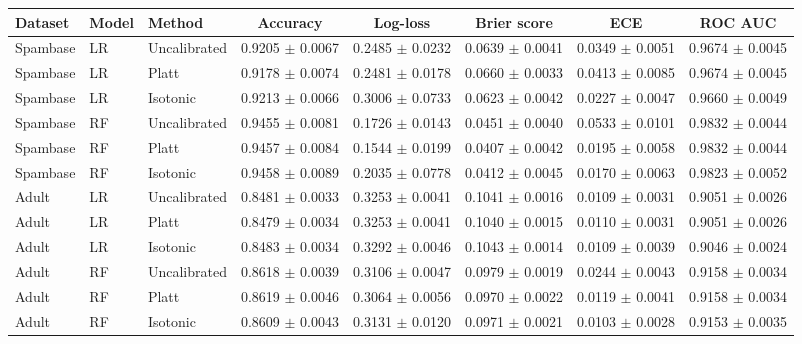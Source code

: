 \begin{tabular}{lllccccc}
\toprule
Dataset & Model & Method & Accuracy & Log-loss & Brier score & ECE & ROC AUC \\
\midrule
Spambase & LR & Uncalibrated & 0.9205 $\pm$ 0.0067 & 0.2485 $\pm$ 0.0232 & 0.0639 $\pm$ 0.0041 & 0.0349 $\pm$ 0.0051 & 0.9674 $\pm$ 0.0045 \\
Spambase & LR & Platt & 0.9178 $\pm$ 0.0074 & 0.2481 $\pm$ 0.0178 & 0.0660 $\pm$ 0.0033 & 0.0413 $\pm$ 0.0085 & 0.9674 $\pm$ 0.0045 \\
Spambase & LR & Isotonic & 0.9213 $\pm$ 0.0066 & 0.3006 $\pm$ 0.0733 & 0.0623 $\pm$ 0.0042 & 0.0227 $\pm$ 0.0047 & 0.9660 $\pm$ 0.0049 \\
\addlinespace
Spambase & RF & Uncalibrated & 0.9455 $\pm$ 0.0081 & 0.1726 $\pm$ 0.0143 & 0.0451 $\pm$ 0.0040 & 0.0533 $\pm$ 0.0101 & 0.9832 $\pm$ 0.0044 \\
Spambase & RF & Platt & 0.9457 $\pm$ 0.0084 & 0.1544 $\pm$ 0.0199 & 0.0407 $\pm$ 0.0042 & 0.0195 $\pm$ 0.0058 & 0.9832 $\pm$ 0.0044 \\
Spambase & RF & Isotonic & 0.9458 $\pm$ 0.0089 & 0.2035 $\pm$ 0.0778 & 0.0412 $\pm$ 0.0045 & 0.0170 $\pm$ 0.0063 & 0.9823 $\pm$ 0.0052 \\
\midrule
Adult & LR & Uncalibrated & 0.8481 $\pm$ 0.0033 & 0.3253 $\pm$ 0.0041 & 0.1041 $\pm$ 0.0016 & 0.0109 $\pm$ 0.0031 & 0.9051 $\pm$ 0.0026 \\
Adult & LR & Platt & 0.8479 $\pm$ 0.0034 & 0.3253 $\pm$ 0.0041 & 0.1040 $\pm$ 0.0015 & 0.0110 $\pm$ 0.0031 & 0.9051 $\pm$ 0.0026 \\
Adult & LR & Isotonic & 0.8483 $\pm$ 0.0034 & 0.3292 $\pm$ 0.0046 & 0.1043 $\pm$ 0.0014 & 0.0109 $\pm$ 0.0039 & 0.9046 $\pm$ 0.0024 \\
\addlinespace
Adult & RF & Uncalibrated & 0.8618 $\pm$ 0.0039 & 0.3106 $\pm$ 0.0047 & 0.0979 $\pm$ 0.0019 & 0.0244 $\pm$ 0.0043 & 0.9158 $\pm$ 0.0034 \\
Adult & RF & Platt & 0.8619 $\pm$ 0.0046 & 0.3064 $\pm$ 0.0056 & 0.0970 $\pm$ 0.0022 & 0.0119 $\pm$ 0.0041 & 0.9158 $\pm$ 0.0034 \\
Adult & RF & Isotonic & 0.8609 $\pm$ 0.0043 & 0.3131 $\pm$ 0.0120 & 0.0971 $\pm$ 0.0021 & 0.0103 $\pm$ 0.0028 & 0.9153 $\pm$ 0.0035 \\
\bottomrule
\end{tabular}
